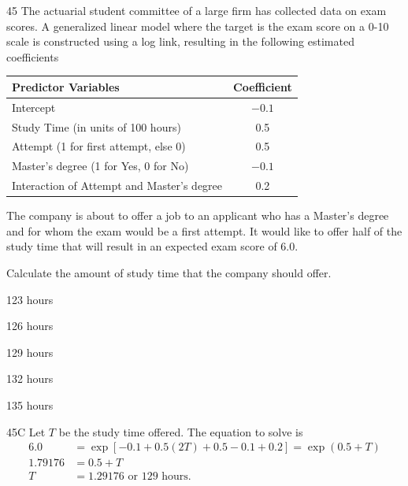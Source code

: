 \begin{question}{45}
The actuarial student committee of a large firm has collected data on exam scores. A generalized linear model where the target is the exam score on a 0-10 scale is constructed using a log link, resulting in the following estimated coefficients
\begin{center}
\begin{tabular}{|l|c|}
\hline
Predictor Variables & Coefficient \\ \hline
Intercept & $-0.1$ \\ \hline
Study Time (in units of 100 hours) & 0.5 \\ \hline
Attempt (1 for first attempt, else 0) & 0.5 \\ \hline
Master's degree (1 for Yes, 0 for No) & $-0.1$ \\ \hline
Interaction of Attempt and Master's degree & 0.2 \\ \hline
\end{tabular}
\end{center}

The company is about to offer a job to an applicant who has a Master's degree and for whom the exam would be a first attempt. It would like to offer half of the study time that will result in an expected exam score of 6.0.

Calculate the amount of study time that the company should offer.

\begin{choices}
\item 123 hours
\item 126 hours
\item 129 hours
\item 132 hours
\item 135 hours
\end{choices}
\end{question}
\begin{solution}{45}{C}
Let $T$ be the study time offered. The equation to solve is
\begin{align*}
6.0 &= \exp[-0.1 + 0.5(2T) + 0.5 - 0.1 + 0.2] = \exp(0.5 + T) \\
1.79176 &= 0.5 + T \\
T &= 1.29176 \text{ or } 129 \text{ hours.}
\end{align*}
\end{solution}

